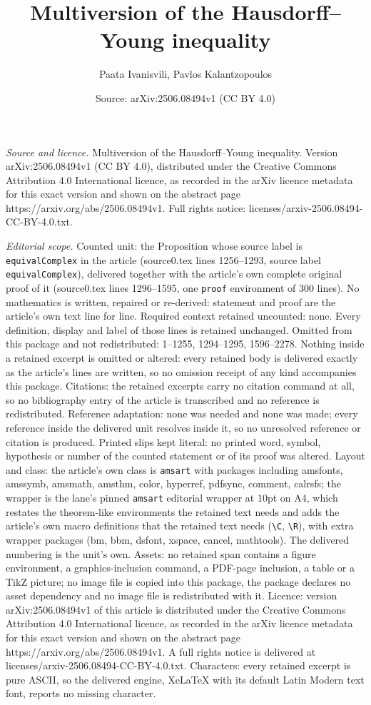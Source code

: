 \documentclass[10pt,a4paper]{amsart}
\title[Multiversion of the Hausdorff--Young inequality]{Multiversion of the Hausdorff--Young inequality}
\author{Paata Ivanisvili, Pavlos Kalantzopoulos}
\date{Source: arXiv:2506.08494v1 (CC BY 4.0)}
\begin{document}
\maketitle

\noindent\emph{Source and licence.} Multiversion of the Hausdorff--Young inequality. Version arXiv:2506.08494v1 (CC BY 4.0), distributed under the Creative Commons Attribution 4.0 International licence, as recorded in the arXiv licence metadata for this exact version and shown on the abstract page https://arxiv.org/abs/2506.08494v1. Full rights notice: licenses/arxiv-2506.08494-CC-BY-4.0.txt.\par\smallskip

\noindent\textit{Editorial scope.} Counted unit: the Proposition whose source label is \texttt{equivalComplex} in the article (source0.tex lines 1256--1293, source label \texttt{equivalComplex}), delivered together with the article's own complete original proof of it (source0.tex lines 1296--1595, one \texttt{proof} environment of 300 lines). No mathematics is written, repaired or re-derived: statement and proof are the article's own text line for line. Required context retained uncounted: none. Every definition, display and label of those lines is retained unchanged. Omitted from this package and not redistributed: 1--1255, 1294--1295, 1596--2278. Nothing inside a retained excerpt is omitted or altered: every retained body is delivered exactly as the article's lines are written, so no omission receipt of any kind accompanies this package. Citations: the retained excerpts carry no citation command at all, so no bibliography entry of the article is transcribed and no reference is redistributed. Reference adaptation: none was needed and none was made; every reference inside the delivered unit resolves inside it, so no unresolved reference or citation is produced. Printed slips kept literal: no printed word, symbol, hypothesis or number of the counted statement or of its proof was altered. Layout and class: the article's own class is \texttt{amsart} with packages including amsfonts, amssymb, amsmath, amsthm, color, hyperref, pdfsync, comment, calrsfs; the wrapper is the lane's pinned \texttt{amsart} editorial wrapper at 10pt on A4, which restates the theorem-like environments the retained text needs and adds the article's own macro definitions that the retained text needs (\texttt{\textbackslash C}, \texttt{\textbackslash R}), with extra wrapper packages (bm, bbm, dsfont, xspace, cancel, mathtools). The delivered numbering is the unit's own. Assets: no retained span contains a figure environment, a graphics-inclusion command, a PDF-page inclusion, a table or a TikZ picture; no image file is copied into this package, the package declares no asset dependency and no image file is redistributed with it. Licence: version arXiv:2506.08494v1 of this article is distributed under the Creative Commons Attribution 4.0 International licence, as recorded in the arXiv licence metadata for this exact version and shown on the abstract page https://arxiv.org/abs/2506.08494v1. A full rights notice is delivered at licenses/arxiv-2506.08494-CC-BY-4.0.txt. Characters: every retained excerpt is pure ASCII, so the delivered engine, XeLaTeX with its default Latin Modern text font, reports no missing character.
\end{document}
